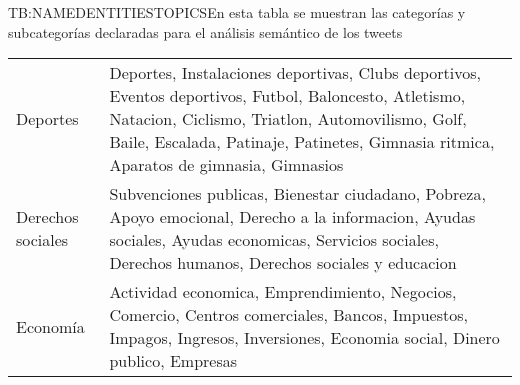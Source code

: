 \begin{table}[Relación de categorías y subcategorías para análisis semántico]{TB:NAMEDENTITIESTOPICS}{En esta tabla se muestran las categorías y subcategorías declaradas para el análisis semántico de los tweets}
\begin{tabular}{|p{5cm}|p{12.5cm}|}
		Deportes &  Deportes, Instalaciones deportivas, Clubs deportivos, Eventos deportivos, Futbol, Baloncesto, Atletismo, Natacion, Ciclismo, Triatlon, Automovilismo, Golf, Baile, Escalada, Patinaje, Patinetes, Gimnasia ritmica, Aparatos de gimnasia, Gimnasios \\
		Derechos sociales &  Subvenciones publicas, Bienestar ciudadano, Pobreza, Apoyo emocional, Derecho a la informacion, Ayudas sociales, Ayudas economicas, Servicios sociales, Derechos humanos, Derechos sociales y educacion \\
		Economía &  Actividad economica, Emprendimiento, Negocios, Comercio, Centros comerciales, Bancos, Impuestos, Impagos, Ingresos, Inversiones, Economia social, Dinero publico, Empresas \\
		\hline \hline
		\hline
	\end{tabular}
\end{table}


